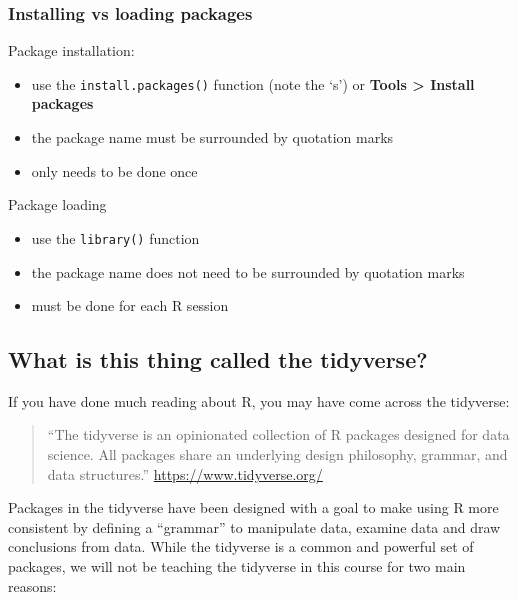 \documentclass[
  a4paper,
]{memoir}
\providecommand{\tightlist}{%
  \setlength{\itemsep}{0pt}\setlength{\parskip}{0pt}}\usepackage{longtable,booktabs,array}
\begin{document}
\hypertarget{installing-vs-loading-packages}{%
\subsubsection{Installing vs loading
packages}\label{installing-vs-loading-packages}}

Package installation:

\begin{itemize}
\tightlist
\item
  use the \texttt{install.packages()} function (note the `s') or
  \textbf{Tools \textgreater{} Install packages}
\item
  the package name must be surrounded by quotation marks
\item
  only needs to be done once
\end{itemize}

Package loading

\begin{itemize}
\tightlist
\item
  use the \texttt{library()} function
\item
  the package name does not need to be surrounded by quotation marks
\item
  must be done for each R session
\end{itemize}

\hypertarget{what-is-this-thing-called-the-tidyverse}{%
\subsection{What is this thing called the
tidyverse?}\label{what-is-this-thing-called-the-tidyverse}}

If you have done much reading about R, you may have come across the
tidyverse:

\begin{quote}
``The tidyverse is an opinionated collection of R packages designed for
data science. All packages share an underlying design philosophy,
grammar, and data structures.'' \url{https://www.tidyverse.org/}
\end{quote}

Packages in the tidyverse have been designed with a goal to make using R
more consistent by defining a ``grammar'' to manipulate data, examine
data and draw conclusions from data. While the tidyverse is a common and
powerful set of packages, we will not be teaching the tidyverse in this
course for two main reasons:
\end{document}
